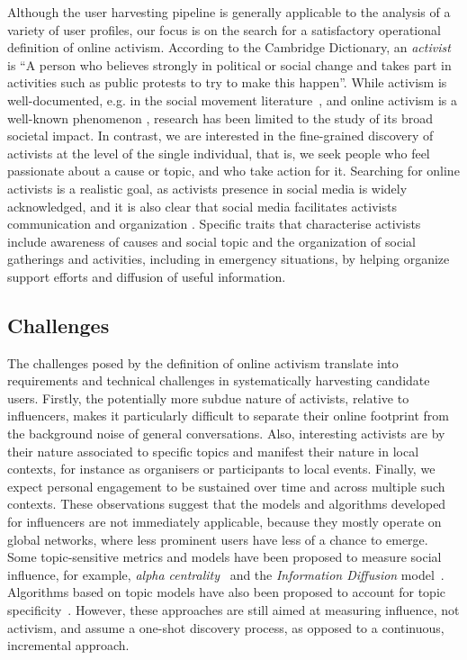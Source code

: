 Although the user harvesting pipeline is generally applicable to the analysis of a variety of user profiles, our focus is on the search for a satisfactory operational definition of online activism. 
%
According to the Cambridge Dictionary, an \textit{activist} is ``A person who believes strongly in political or social change and takes part in activities such as public protests to try to make this happen''.
%
While activism is well-documented, e.g. in the social movement literature~\cite{doi:10.1080/14742830701497277}, and online activism is a well-known phenomenon \cite{IJoC1246}, research has been limited to the study of its broad societal impact. 
In contrast, we are interested in the fine-grained discovery of activists at the level of the single individual, that is, we seek people who feel passionate about a cause or topic, and who take action for it. 
Searching for online activists is a realistic goal, as activists presence in social media is widely acknowledged, and it is also clear that social media facilitates activists communication and organization \cite{Poell2014,Youmans2012}. 
Specific traits that characterise activists include awareness of causes and social topic and the organization of social gatherings and activities, including in emergency situations, by helping organize support efforts and diffusion of useful information.
 
\subsection{Challenges}
 
The challenges posed by the definition of online activism translate into requirements and technical challenges in systematically harvesting candidate users.
%
Firstly, the potentially more subdue nature of activists, relative to influencers, makes it particularly difficult to separate their online footprint from the background noise of general conversations.
Also, interesting activists are by their nature associated to specific topics and manifest their nature in local contexts, for instance as organisers or participants to local events. 
Finally, we expect personal engagement to be sustained over time and across multiple such contexts. 
These observations suggest that the models and algorithms developed for influencers are not immediately applicable, because they mostly operate on global networks, where less prominent users have less of a chance to emerge.
Some topic-sensitive metrics and models have been proposed to measure social influence, for example, \textit{alpha centrality}~\cite{Bonacich2001,Overbey2013} and the \textit{Information Diffusion} model~\cite{Pal2011}. Algorithms based on topic models have also been proposed to account for topic specificity~\cite{Zhao2011b}. However, these approaches are still aimed at measuring influence, not activism, and assume a one-shot discovery process, as opposed to a continuous, incremental approach.

